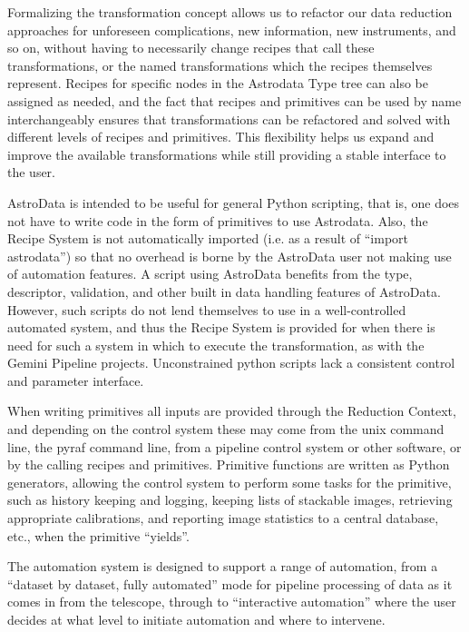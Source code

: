 \documentclass[letterpaper,10pt,english]{sphinxmanual}
\begin{document}
Formalizing the transformation concept allows us to refactor our data
reduction approaches for unforeseen complications, new information,
new instruments, and so on, without having to necessarily change
recipes that call these transformations, or the named transformations
which the recipes themselves represent. Recipes for specific nodes in
the Astrodata Type tree can also be assigned as needed, and the fact
that recipes and primitives can be used by name interchangeably
ensures that transformations can be refactored and solved with
different levels of recipes and primitives.  This flexibility helps us
expand and improve the available
transformations while still providing a stable interface to the user.

AstroData is intended to be useful for general Python scripting, that
is, one does not have to write code in the form of primitives to use
Astrodata. Also, the Recipe System is not
automatically imported (i.e. as a result of ``import astrodata'') so
that no overhead is borne by the AstroData user not making use of
automation features. A script
using AstroData benefits from the type, descriptor, validation, and
other built in data handling features of AstroData. However, such
scripts do not lend themselves to use in a well-controlled automated
system, and thus the Recipe System is provided for when there is need
for such a system in which to execute the transformation, as with the
Gemini Pipeline projects. Unconstrained python scripts lack a
consistent control and parameter interface.

When writing primitives all inputs are provided through the Reduction
Context, and depending on the control system these may come from the
unix command line, the pyraf command line, from a pipeline control
system or other software, or by the calling recipes and primitives.
Primitive functions are written as Python generators, allowing the
control system to perform some tasks for the primitive, such as
history keeping and logging, keeping lists of stackable images,
retrieving appropriate calibrations, and reporting image statistics to
a central database, etc., when the primitive ``yields''.

The automation system is designed to support a range of automation,
from a ``dataset by dataset, fully automated'' mode for pipeline
processing of data as it comes in from the telescope, through to
``interactive automation'' where the user decides at what level to
initiate automation and where to intervene.
\end{document}
